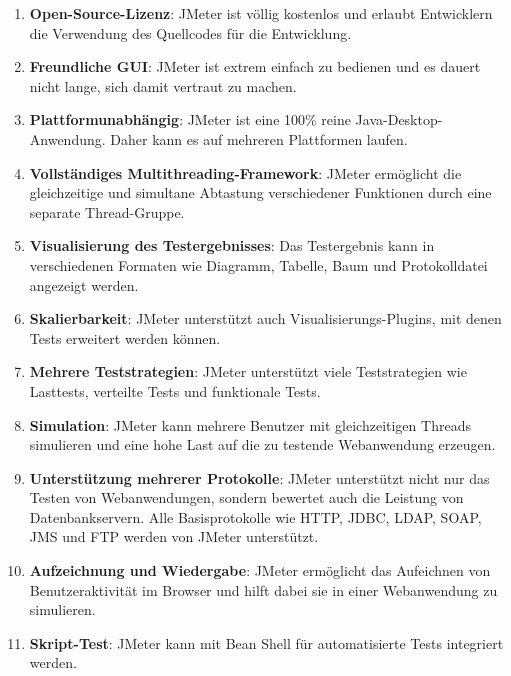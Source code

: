 \begin{enumerate}

    \item \textbf{Open-Source-Lizenz}: JMeter ist völlig kostenlos und erlaubt
     Entwicklern die Verwendung des Quellcodes für die Entwicklung.

    \item \textbf{Freundliche GUI}: JMeter ist extrem einfach zu bedienen und es
    dauert nicht lange, sich damit vertraut zu machen.

    \item \textbf{Plattformunabhängig}: JMeter ist eine 100\% reine
    Java-Desktop-Anwendung. Daher kann es auf mehreren Plattformen laufen.

    \item \textbf{Vollständiges Multithreading-Framework}: JMeter ermöglicht die
    gleichzeitige und simultane Abtastung verschiedener Funktionen durch
    eine separate Thread-Gruppe.

    \item \textbf{Visualisierung des Testergebnisses}: Das Testergebnis kann in
    verschiedenen Formaten wie Diagramm, Tabelle, Baum und Protokolldatei
    angezeigt werden.

    \item \textbf{Skalierbarkeit}: JMeter  unterstützt auch Visualisierungs-Plugins,
    mit denen Tests erweitert werden können.

    \item \textbf{Mehrere Teststrategien}: JMeter unterstützt viele
    Teststrategien wie Lasttests, verteilte Tests und funktionale Tests.

    \item \textbf{Simulation}: JMeter kann mehrere Benutzer mit gleichzeitigen Threads
    simulieren und eine hohe Last auf die zu testende Webanwendung erzeugen.

    \item \textbf{Unterstützung mehrerer Protokolle}: JMeter unterstützt nicht
    nur das Testen von Webanwendungen, sondern bewertet auch die
    Leistung von Datenbankservern. Alle Basisprotokolle wie HTTP, JDBC,
    LDAP, SOAP, JMS und FTP werden von JMeter unterstützt.

    \item \textbf{Aufzeichnung und Wiedergabe}: JMeter ermöglicht das Aufeichnen
    von Benutzeraktivität im Browser und hilft dabei sie in einer
    Webanwendung zu simulieren.

    \item \textbf{Skript-Test}: JMeter kann mit Bean Shell für automatisierte Tests
    integriert werden.

\end{enumerate}

